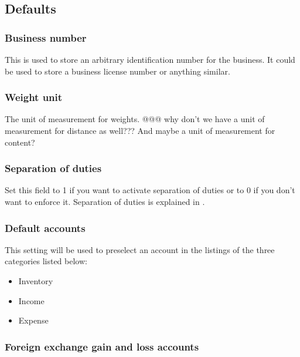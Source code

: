 \subsection{Defaults}
\label{subsec-company-config-defaults}

\subsubsection{Business number}
\label{subsubsec-company-config-defaults-business-number}
   This is used to store an arbitrary identification number for the business.  It
could be used to store a business license number or anything similar.
   
\subsubsection{Weight unit}
\label{subsubsec-company-config-defaults-weight-unit}
   The unit of measurement for weights. @@@ why don't we have a unit of measurement for distance as well??? And maybe a unit of measurement for content?
   
\subsubsection{Separation of duties}
\label{subsubsec-company-config-defaults-separation-of-duties}

Set this field to 1 if you want to activate separation of duties or to 0 if you don't
want to enforce it. Separation of duties is explained in .

\subsubsection{Default accounts}
\label{subsubsec-company-config-defaults-accounts}

This setting will be used to preselect an account in
the listings of the three categories listed below:
\begin{itemize}
\item Inventory
\item Income
\item Expense
\end{itemize}


\subsubsection{Foreign exchange gain and loss accounts}
\label{subsubsec-company-config-defaults-fx-accounts}

